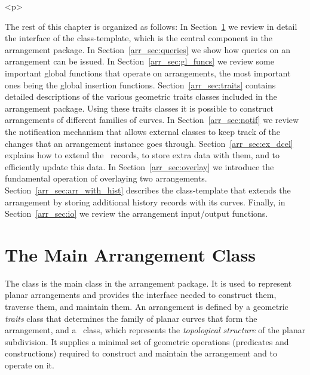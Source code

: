 \begin{ccHtmlOnly}<p>\end{ccHtmlOnly}
The rest of this chapter is organized as follows: In
Section~\ref{arr_sec:arr_class} we review in detail the interface
of the  class-template, which is the central
component in the arrangement package. In
Section~\ref{arr_sec:queries} we show how queries on an arrangement
can be issued. In Section~\ref{arr_sec:gl_funcs} we
review some important global functions that operate on
arrangements, the most important ones being the global insertion
functions. Section~\ref{arr_sec:traits} contains detailed
descriptions of the various geometric traits classes included in
the arrangement package. Using these traits classes it is possible
to construct arrangements of different families of curves. In
Section~\ref{arr_sec:notif} we review the notification mechanism
that allows external classes to keep track of the changes that an
arrangement instance goes through. Section~\ref{arr_sec:ex_dcel}
explains how to extend the \dcel\ records, to store extra data
with them, and to efficiently update this data.
In Section~\ref{arr_sec:overlay} we introduce the fundamental
operation of overlaying two arrangements.
Section~\ref{arr_sec:arr_with_hist} describes the
 class-template that extends the
arrangement by storing additional history records with its curves.
Finally, in Section~\ref{arr_sec:io} we review the arrangement
input/output functions.

\section{The Main Arrangement Class}
\label{arr_sec:arr_class}
%
The class  is the main class in
the arrangement package. It is used to represent planar
arrangements and provides the interface needed to construct them,
traverse them, and maintain them. An arrangement is defined by
a geometric {\em traits} class that determines the family of planar
curves that form the arrangement, and a \dcel\ class, which
represents the {\em topological structure} of the planar subdivision.
It supplies a minimal set of geometric operations (predicates and
constructions) required to construct and maintain the arrangement
and to operate on it.

